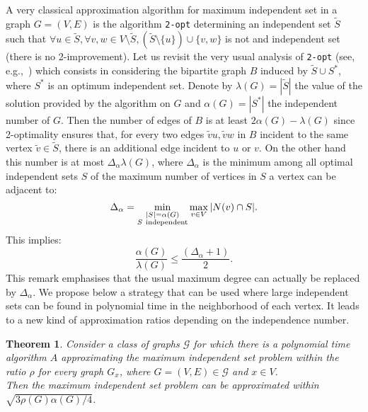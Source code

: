 \documentclass[final]{dmtcs-episciences}
\newtheorem{theorem}{Theorem}
\begin{document}
A very classical approximation algorithm for maximum independent set in a graph $G=(V,E)$ is the  algorithm {\tt 2-opt} determining an independent set $\tilde S$ such that $\forall u \in \tilde S, \forall v,w \in V\setminus \tilde S, (\tilde S\setminus \{u\})\cup \{v,w\}$ is not and independent set (there is no 2-improvement). Let us revisit the very usual analysis of {\tt 2-opt} (see, e.g.,~\citet{ejorapprox})  which consists in considering the bipartite graph $B$ induced by $\tilde S \cup S^*$, where $S^*$ is an optimum independent set. Denote by $\lambda(G)=|\tilde S|$ the value of the solution provided by the algorithm on $G$ and 
$\alpha(G)=|S^*|$ the independent number of $G$. Then the number of edges of $B$ is at least $2\alpha(G) - \lambda(G)$ since 2-optimality ensures that, for every two edges $\tilde vu, \tilde v w$ in $B$ incident to the same vertex   $\tilde v\in\tilde S$, there is an additional edge incident to $u$ or $v$. On the other hand this number is at most $\Delta_{\alpha}\lambda(G)$, where $\Delta_{\alpha}$ is
the minimum among all optimal independent sets $S$ of the maximum number of vertices in $S$ a vertex can be adjacent to:
$$\Delta_{\alpha}=\min_{\substack{|S|=\alpha(G)\\ S\ {\rm independent}}} \max_{v\in V}|N(v)\cap S|.$$  
This implies:
\begin{equation}\label{eq:2opt}
\frac{\alpha(G)}{\lambda(G)}\leq \frac{(\Delta_{\alpha}+1)}{2}.
\end{equation}
 This remark emphasises that the usual maximum degree can actually be replaced by $\Delta_{\alpha}$.
 We propose below a strategy that can be used where large independent sets can be found in polynomial time in the neighborhood of each vertex. It leads to a new kind of approximation ratios depending on the independence number.
 \begin{theorem}\label{th:approx}
Consider a class of graphs $\mathcal{G}$ for which there is a polynomial time algorithm $A$ approximating the maximum independent set problem within the ratio $\rho$ for every graph $G_x$, where $G=(V,E)\in  \mathcal{G}$ and  $x\in V$.\\
 Then  the maximum independent set problem can be approximated within $\sqrt{3\rho(G)\alpha(G)/4}$.\end{theorem}
\end{document}
